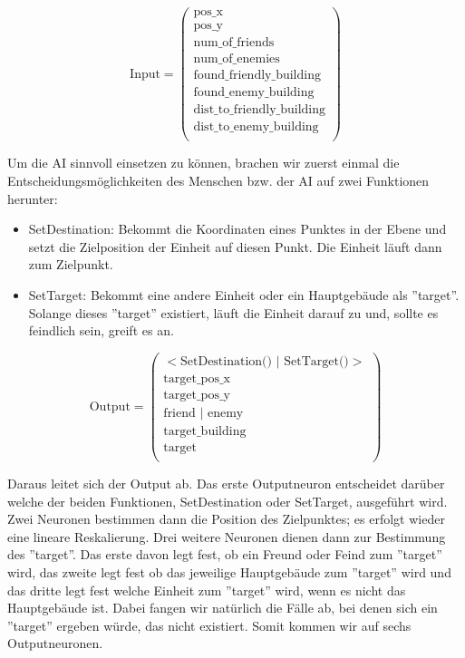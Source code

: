 \documentclass[
	12pt,
	a4paper,
	BCOR10mm,
	DIV14,
	headsepline,
	usegeometry,
]{scrreprt}
\begin{document}
\begin{equation}
	\text{Input} = \left( \begin{matrix}
		\text{pos\_x} \\
		\text{pos\_y} \\
	\text{num\_of\_friends} \\
		\text{num\_of\_enemies} \\
		\text{found\_friendly\_building} \\
		\text{found\_enemy\_building} \\
		\text{dist\_to\_friendly\_building} \\
		\text{dist\_to\_enemy\_building} \\
	\end{matrix} \right)
\end{equation}


Um die AI sinnvoll einsetzen zu können, brachen wir zuerst einmal die Entscheidungsmöglichkeiten des Menschen bzw. der AI auf zwei Funktionen herunter: 

\begin{itemize}
	\item SetDestination: Bekommt die Koordinaten eines Punktes in der Ebene und setzt die Zielposition der Einheit auf diesen Punkt.
Die Einheit läuft dann zum Zielpunkt.
	\item SetTarget: Bekommt eine andere Einheit oder ein Hauptgebäude als ''target''.
Solange dieses ''target'' existiert, läuft die Einheit darauf zu und, sollte es feindlich sein, greift es an.
\end{itemize}

\begin{equation}
	\text{Output} = \left( \begin{matrix}
		<\text{SetDestination() | SetTarget()}> \\
		\text{target\_pos\_x} \\
		\text{target\_pos\_y} \\
		\text{friend | enemy} \\
		\text{target\_building} \\
		\text{target} \\
	\end{matrix} \right)
\end{equation}

Daraus leitet sich der Output ab.
Das erste Outputneuron entscheidet darüber welche der beiden Funktionen, SetDestination oder SetTarget, ausgeführt wird.
Zwei Neuronen bestimmen dann die Position des Zielpunktes; es erfolgt wieder eine lineare Reskalierung.
Drei weitere Neuronen dienen dann zur Bestimmung des ''target''.
Das erste davon legt fest, ob ein Freund oder Feind zum ''target'' wird, das zweite legt fest ob das jeweilige Hauptgebäude zum ''target'' wird und das dritte legt fest welche Einheit zum ''target'' wird, wenn es nicht das Hauptgebäude ist.
Dabei fangen wir natürlich die Fälle ab, bei denen sich ein ''target'' ergeben würde, das nicht existiert.
Somit kommen wir auf sechs Outputneuronen.
\end{document}
